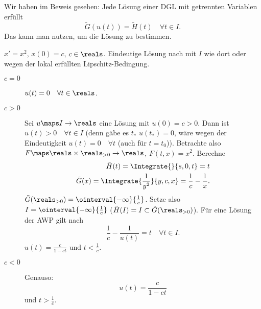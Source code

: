 \begin{bemerkung*}
  Wir haben im Beweis gesehen: Jede Lösung einer DGL mit getrennten Variablen erfüllt
  \begin{equation*}
    \tilde{G}(u(t))=\tilde{H}(t)\quad \forall t\in I.
  \end{equation*}
  Das kann man nutzen, um die Lösung zu bestimmen.
\end{bemerkung*}
\begin{beispiel*}
  \( x'=x^2 \), \( x(0)=c \), \( c\in\reals \). Eindeutige Lösung nach  mit \( I \) wie dort oder wegen der lokal erfüllten Lipschitz-Bedingung.
  \begin{description}
    \item[\( c=0 \)] \( u(t)=0\quad \forall t\in \reals \).
    \item[\( c>0 \)] Sei \( u\maps I\to \reals \) eine Lösung mit \( u(0)=c>0 \). Dann ist \( u(t)>0 \quad \forall t\in I\) (denn gäbe es \( t_{*} \) \sd \( u(t_{*})=0 \), wäre wegen der Eindeutigkeit \( u(t)=0\quad \forall t \) (auch für \( t=t_0 \))). Betrachte also \( F\maps \reals\times\reals_{>0}\to \reals \), \( F(t,x)=x^2 \). Berechne 
    \begin{align*}
      \tilde{H}(t)=\Integrate{}{s,0,t}=t\\
      \tilde{G}(x)=\Integrate{\frac{1}{y^2}}{y,c,x}=\frac{1}{c}-\frac{1}{x}.
    \end{align*}
    \( \tilde{G}(\reals_{>0})=\ointerval{-\infty}{\frac{1}{c}} \). Setze also \( I=\ointerval{-\infty}{\frac{1}{c}} \) (\sd \( \tilde{H}(I)=I\subset \tilde{G}(\reals_{>0}) \)). Für eine Lösung der AWP gilt nach 
    \begin{equation*}
      \frac{1}{c}-\frac{1}{u(t)}=t\quad \forall t\in I.
    \end{equation*}
    \timplies \( u(t)=\frac{c}{1-ct} \) und \( t<\frac{1}{c} \).
    \item[\( c<0 \)] Genauso:
    \begin{equation*}
      u(t)=\frac{c}{1-ct}
    \end{equation*}
    und \( t>\frac{1}{c} \).
  \end{description}
\end{beispiel*}
